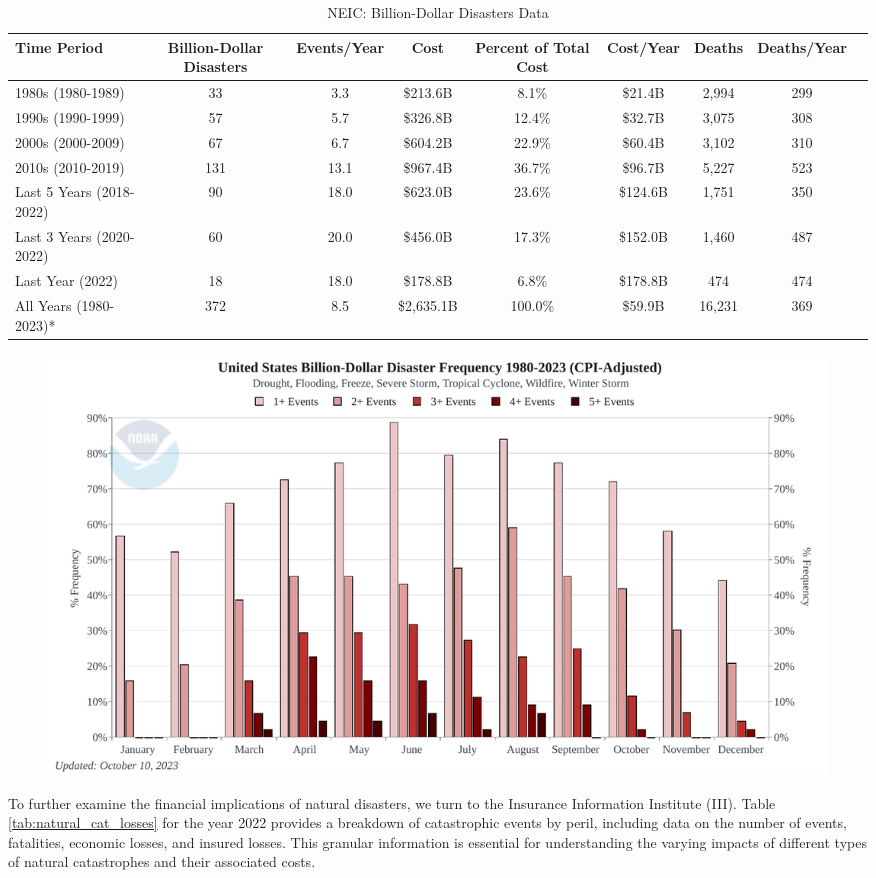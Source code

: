 \documentclass[12pt]{article}
\begin{document}
\begin{table}[h]
  \label{tab:bil_dol_disasters} 
    \centering
    \begin{tabular}{|l|c|c|c|c|c|c|c|c|}
        \hline
        Time Period & Billion-Dollar Disasters & Events/Year & Cost & Percent of Total Cost & Cost/Year & Deaths & Deaths/Year \\
        \hline
        1980s (1980-1989) & 33 & 3.3 & \$213.6B & 8.1\% & \$21.4B & 2,994 & 299 \\
        1990s (1990-1999) & 57 & 5.7 & \$326.8B & 12.4\% & \$32.7B & 3,075 & 308 \\
        2000s (2000-2009) & 67 & 6.7 & \$604.2B & 22.9\% & \$60.4B & 3,102 & 310 \\
        2010s (2010-2019) & 131 & 13.1 & \$967.4B & 36.7\% & \$96.7B & 5,227 & 523 \\
        Last 5 Years (2018-2022) & 90 & 18.0 & \$623.0B & 23.6\% & \$124.6B & 1,751 & 350 \\
        Last 3 Years (2020-2022) & 60 & 20.0 & \$456.0B & 17.3\% & \$152.0B & 1,460 & 487 \\
        Last Year (2022) & 18 & 18.0 & \$178.8B & 6.8\% & \$178.8B & 474 & 474 \\
        All Years (1980-2023)* & 372 & 8.5 & \$2,635.1B & 100.0\% & \$59.9B & 16,231 & 369 \\
        \hline
    \end{tabular}
    \caption{NEIC: Billion-Dollar Disasters Data}
    \cite{ncei}
\end{table}

\begin{figure}[ht]
    \centering
    \includegraphics[width=0.8\linewidth]{NCEI US disaster freq.pdf}
    \caption{}
    \label{fig:disaster_freq}
\end{figure}

To further examine the financial implications of natural disasters, we turn to the Insurance Information Institute (III)\cite{iii}. 
Table \ref{tab:natural_cat_losses} for the year 2022 provides a breakdown of catastrophic events by peril, including data on the 
number of events, fatalities, economic losses, and insured losses. This granular information is essential for understanding the 
varying impacts of different types of natural catastrophes and their associated costs.
\end{document}
